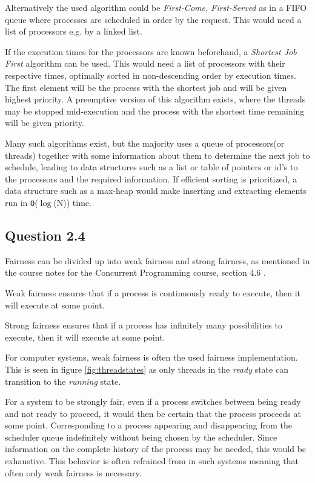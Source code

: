 Alternatively the used algorithm could be \textit{First-Come, First-Served} as in a FIFO queue where processes are scheduled in order by the request. This would need a list of processors e.g. by a linked list.

If the execution times for the processors are known beforehand, a \textit{Shortest Job First} algorithm can be used. This would need a list of processors with their respective times, optimally sorted in non-descending order by execution times. The first element will be the process with the shortest job and will be given highest priority. A preemptive version of this algorithm exists, where the threads may be stopped mid-execution and the process with the shortest time remaining will be given priority.

Many such algorithms exist, but the majority uses a queue of processors(or threads) together with some information about them to determine the next job to schedule, leading to data structures such as a list or table of pointers or id's to the processors and the required information. If efficient sorting is prioritized, a data structure such as a max-heap would make inserting and extracting elements run in \texttt{O}($\log$(N)) time.

\subsection*{Question 2.4}

Fairness can be divided up into weak fairness and strong fairness, as mentioned in the course notes for the Concurrent Programming course, section 4.6 \cite{coursenotes}. 

Weak fairness ensures that if a process is continuously ready to execute, then it will execute at some point. 

Strong fairness ensures that if a process has infinitely many possibilities to execute, then it will execute at some point. 

For computer systems, weak fairness is often the used fairness implementation. This is seen in figure \ref{fig:threadstates} as only threads in the \textit{ready} state can transition to the \textit{running} state. 

For a system to be strongly fair, even if a process switches between being ready and not ready to proceed, it would then be certain that the process proceeds at some point. Corresponding to a process appearing and disappearing from the scheduler queue indefinitely without being chosen by the scheduler. Since information on the complete history of the process may be needed, this would be exhaustive. This behavior is often refrained from in such systems meaning that often only weak fairness is necessary.

